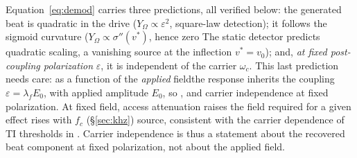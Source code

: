 \documentclass[11pt,a4paper]{article}
\newcommand{\Sig}{\sigma}
\providecommand{\DIFaddtex}[1]{{\protect\color{blue} \sf #1}} %
\providecommand{\DIFdeltex}[1]{{\protect\color{red} \scriptsize #1}} %
\providecommand{\DIFaddbegin}{} %
\providecommand{\DIFaddend}{} %
\providecommand{\DIFdelbegin}{} %
\providecommand{\DIFdelend}{} %
\providecommand{\DIFadd}[1]{\texorpdfstring{\DIFaddtex{#1}}{#1}} %
\providecommand{\DIFdel}[1]{\texorpdfstring{\DIFdeltex{#1}}{}} %
\begin{document}
\DIFdel{Equation~\eqref{eq:demod} carries three predictions, all verified below: the
generated beat is quadratic in the drive ($Y_\Omega\propto\varepsilon^2$,
square-law detection); it follows the sigmoid curvature
($Y_\Omega\propto\Sig''(v^*)$, hence zero }\DIFdelend \DIFaddbegin \DIFadd{The static detector predicts quadratic scaling, a vanishing source }\DIFaddend at the
inflection\DIFdelbegin \DIFdel{$v^*=v_0$); and, \emph{at
fixed post-coupling polarization} $\varepsilon$, it is independent of the carrier $\omega_c$. This last prediction needs care: as a function of the \emph{applied} fieldthe
response inherits the coupling $\varepsilon=\lambda_f E_0$,
with applied amplitude $E_0$,
so }\DIFdelend \DIFaddbegin \DIFadd{, and carrier independence at fixed polarization. At fixed field,
access attenuation raises }\DIFaddend the field required for a given \DIFdelbegin \DIFdel{effect rises with $f_c$ (\S\ref{sec:khz})}\DIFdelend \DIFaddbegin \DIFadd{source}\DIFaddend , consistent
with \DIFdelbegin \DIFdel{the carrier
dependence of TI thresholds in \cite{opancar2025,peripheral2023}.
Carrier independence is thus a statement about the recovered beat component at fixed
polarization, not about the applied field.
}%

\end{document}
